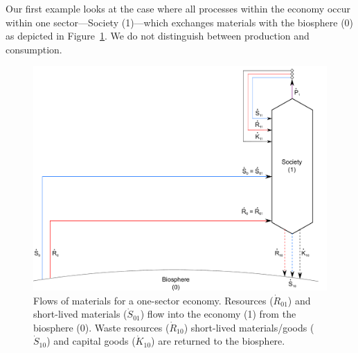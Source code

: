 Our first example looks at the case where all processes within the economy occur within
one sector---Society (1)---which exchanges materials with the biosphere (0) as depicted in
Figure~\ref{fig:A_materials}.  We do not distinguish between production and consumption.

\begin{figure}[!ht]
\centering{}
\includegraphics[width=0.8\linewidth]{Part_1/Chapter_Materials/images/1_sector_materials.pdf}
\caption[Flows of materials for a one-sector economy]{Flows of materials 
for a one-sector economy. 
Resources ($\dot{R}_{01}$) and short-lived materials 
($\dot{S}_{01}$) flow into the economy (1) 
from the biosphere (0). Waste resources 
($\dot{R}_{10}$) short-lived materials/goods 
($\dot{S}_{10}$) and capital goods 
($\dot{K}_{10}$) are returned to the biosphere.}
\label{fig:A_materials}
\end{figure}

